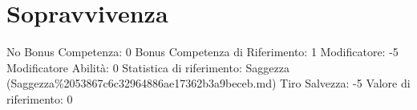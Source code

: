 \section{Sopravvivenza}\label{sopravvivenza}

\begin{description}
\tightlist
\item[Tags: ABI]
No Bonus Competenza: 0 Bonus Competenza di Riferimento: 1 Modificatore:
-5 Modificatore Abilità: 0 Statistica di riferimento: Saggezza
(Saggezza\%2053867c6c32964886ae17362b3a9beceb.md) Tiro Salvezza: -5
Valore di riferimento: 0
\end{description}
